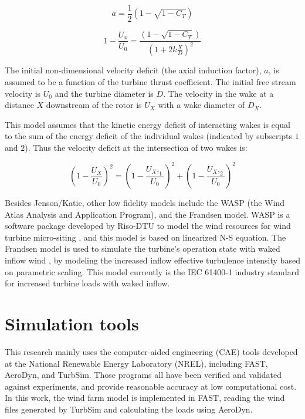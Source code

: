 \documentclass{umthesis}
\begin{document}
\begin{equation}
  a=\frac{1}{2} (1-\sqrt{1-C_T})
\end{equation}

\begin{equation}
  1-\frac{U_x}{U_0}=\frac{(1-\sqrt{1-C_T})}{(1+2k\frac{X}{D})^2}
\end{equation}

The initial non-dimensional velocity deficit (the axial induction factor), $a$, is assumed to be a function of the turbine thrust coefficient. The initial free stream velocity is $U_0$ and the turbine diameter is $D$. The velocity in the wake at a distance $X$ downstream of the rotor is $U_X$ with a wake diameter of $D_X$.

This model assumes that the kinetic energy deficit of interacting wakes is equal to the sum of the energy deficit of the individual wakes (indicated by subscripts $1$ and $2$). Thus the velocity deficit at the intersection of two wakes is:

\begin{equation}
  (1-\frac{U_X}{U_0})^2=(1-\frac{U_X,_1}{U_0})^2+(1-\frac{U_X,_2}{U_0})^2
\end{equation}

Besides Jenson/Katic, other low fidelity models include the WASP (the Wind Atlas Analysis and Application Program), and the Frandsen model. WASP is a software package developed by Riso-DTU to model the wind resources for wind turbine micro-siting \cite{WASP}, and this model is based on linearized N-S equation. The Frandsen model is used to simulate the turbine's operation state with waked inflow wind \cite{Frandsen_2007}, by modeling the increased inflow effective turbulence intensity based on parametric scaling. This model currently is the IEC 61400-1 industry standard for increased turbine loads with waked inflow.


\section{Simulation tools}
This research mainly uses the computer-aided engineering (CAE) tools developed at the National Renewable Energy Laboratory (NREL), including FAST, AeroDyn, and TurbSim. Those programs all have been verified and validated against experiments, and provide reasonable accuracy at low computational cost. In this work, the wind farm model is implemented in FAST, reading the wind files generated by TurbSim and calculating the loads using AeroDyn.
\end{document}
